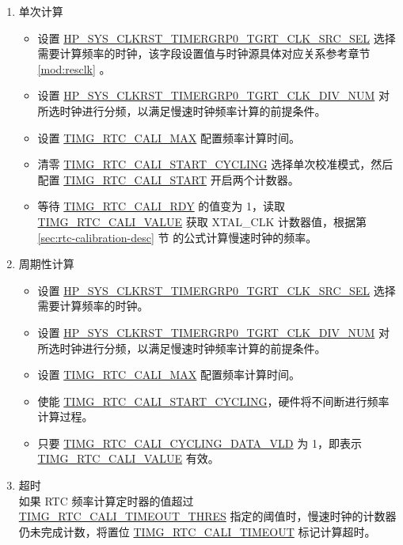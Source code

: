 \documentclass[main\_\_CN.tex]{subfiles}
\begin{document}
\begin{enumerate}
    \item 单次计算
    \begin{itemize}
        \item 设置 \hyperref[fielddesc:HPSYSCLKRSTTIMERGRP0TGRTCLKSRCSEL]{HP\_SYS\_CLKRST\_TIMERGRP0\_TGRT\_CLK\_SRC\_SEL} 选择需要计算频率的时钟，该字段设置值与时钟源具体对应关系参考章节 \ref{mod:resclk} \textit{}。

        \item 设置 \hyperref[fielddesc:HPSYSCLKRSTTIMERGRP0TGRTCLKDIVNUM]{HP\_SYS\_CLKRST\_TIMERGRP0\_TGRT\_CLK\_DIV\_NUM} 对所选时钟进行分频，以满足慢速时钟频率计算的前提条件。

        \item 设置 \hyperref[fielddesc:TIMGRTCCALIMAX]{TIMG\_RTC\_CALI\_MAX} 配置频率计算时间。

        \item 清零 \hyperref[fielddesc:TIMGRTCCALISTARTCYCLING]{TIMG\_RTC\_CALI\_START\_CYCLING} 选择单次校准模式，然后配置 \hyperref[fielddesc:TIMGRTCCALISTART]{TIMG\_RTC\_CALI\_START} 开启两个计数器。

        \item 等待 \hyperref[fielddesc:TIMGRTCCALIRDY]{TIMG\_RTC\_CALI\_RDY} 的值变为 1，读取 \hyperref[fielddesc:TIMGRTCCALIVALUE]{TIMG\_RTC\_CALI\_VALUE} 获取 XTAL\_CLK 计数器值，根据第 \ref{sec:rtc-calibration-desc} 节 \textit{} 的公式计算慢速时钟的频率。
    \end{itemize}
    \item 周期性计算
    \begin{itemize}
        \item 设置 \hyperref[fielddesc:HPSYSCLKRSTTIMERGRP0TGRTCLKSRCSEL]{HP\_SYS\_CLKRST\_TIMERGRP0\_TGRT\_CLK\_SRC\_SEL} 选择需要计算频率的时钟。

        \item 设置 \hyperref[fielddesc:HPSYSCLKRSTTIMERGRP0TGRTCLKDIVNUM]{HP\_SYS\_CLKRST\_TIMERGRP0\_TGRT\_CLK\_DIV\_NUM} 对所选时钟进行分频，以满足慢速时钟频率计算的前提条件。

        \item 设置 \hyperref[fielddesc:TIMGRTCCALIMAX]{TIMG\_RTC\_CALI\_MAX} 配置频率计算时间。

        \item 使能 \hyperref[fielddesc:TIMGRTCCALISTARTCYCLING]{TIMG\_RTC\_CALI\_START\_CYCLING}，硬件将不间断进行频率计算过程。

        \item 只要 \hyperref[fielddesc:TIMGRTCCALICYCLINGDATAVLD]{TIMG\_RTC\_CALI\_CYCLING\_DATA\_VLD} 为 1，即表示 \hyperref[fielddesc:TIMGRTCCALIVALUE]{TIMG\_RTC\_CALI\_VALUE} 有效。
    \end{itemize}
    \item 超时\\
    如果 RTC 频率计算定时器的值超过 \hyperref[fielddesc:TIMGRTCCALITIMEOUTTHRES]{TIMG\_RTC\_CALI\_TIMEOUT\_THRES} 指定的阈值时，慢速时钟的计数器仍未完成计数，将置位 \hyperref[fielddesc:TIMGRTCCALITIMEOUT]{TIMG\_RTC\_CALI\_TIMEOUT} 标记计算超时。
\end{enumerate}
\end{document}
